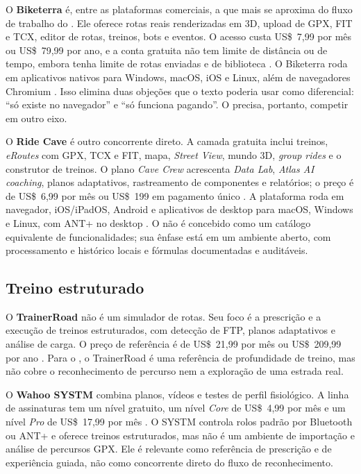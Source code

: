 O \textbf{Biketerra} é, entre as plataformas comerciais, a que mais se aproxima
do fluxo de trabalho do \argus{}. Ele oferece rotas reais renderizadas em 3D,
upload de GPX, FIT e TCX, editor de rotas, treinos, bots e eventos. O acesso
custa US\$~7,99 por mês ou US\$~79,99 por ano, e a conta gratuita não tem limite
de distância ou de tempo, embora tenha limite de rotas enviadas e de biblioteca
\cite{biketerra_pricing,biketerra_site}. O Biketerra roda em aplicativos nativos
para Windows, macOS, iOS e Linux, além de navegadores Chromium
\cite{biketerra_site}. Isso elimina duas objeções que o texto poderia usar como
diferencial: ``só existe no navegador'' e ``só funciona pagando''. O \argus{}
precisa, portanto, competir em outro eixo.

O \textbf{Ride Cave} é outro concorrente direto. A camada gratuita inclui
treinos, \textit{eRoutes} com GPX, TCX e FIT, mapa, \textit{Street View},
mundo 3D, \textit{group rides} e o construtor de treinos. O plano
\textit{Cave Crew} acrescenta \textit{Data Lab}, \textit{Atlas AI coaching},
planos adaptativos, rastreamento de componentes e relatórios; o preço é de
US\$~6,99 por mês ou US\$~199 em pagamento único \cite{ridecave_pricing}.
A plataforma roda em navegador, iOS/iPadOS, Android e aplicativos de desktop
para macOS, Windows e Linux, com ANT+ no desktop \cite{ridecave_site}. O
\argus{} não é concebido como um catálogo equivalente de funcionalidades; sua
ênfase está em um ambiente aberto, com processamento e histórico locais e
fórmulas documentadas e auditáveis.

\subsection{Treino estruturado}
\label{sec:treino-estruturado}

O \textbf{TrainerRoad} não é um simulador de rotas. Seu foco é a prescrição e a
execução de treinos estruturados, com detecção de FTP, planos adaptativos e
análise de carga. O preço de referência é de US\$~21,99 por mês ou
US\$~209,99 por ano \cite{trainerroad_pricing}. Para o \argus{}, o TrainerRoad é
uma referência de profundidade de treino, mas não cobre o reconhecimento de
percurso nem a exploração de uma estrada real.

O \textbf{Wahoo SYSTM} combina planos, vídeos e testes de perfil fisiológico.
A linha de assinaturas tem um nível gratuito, um nível \textit{Core} de
US\$~4,99 por mês e um nível \textit{Pro} de US\$~17,99 por mês
\cite{wahoo_systm}. O SYSTM controla rolos padrão por Bluetooth ou ANT+ e
oferece treinos estruturados, mas não é um ambiente de importação e análise de
percursos GPX. Ele é relevante como referência de prescrição e de experiência
guiada, não como concorrente direto do fluxo de reconhecimento.

